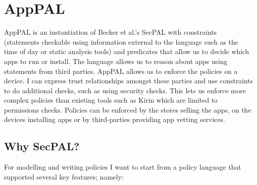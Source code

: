 \documentclass[thesis.tex]{subfiles}
\begin{document}
\chapter{AppPAL}
\label{chap:apppal}

AppPAL is an instantiation of Becker et al.'s SecPAL\cite{becker_secpal:_2010} with constraints (statements checkable using information external to the language such as the time of day or static analysis tools) and predicates that allow us to decide which apps to run or install.
The language allows us to reason about apps using statements from third parties. AppPAL allows us to enforce the policies on a device.
I can express trust relationships amongst these parties and use constraints to do additional checks, such as using security checks.
This lets us enforce more complex policies than existing tools such as Kirin which are limited to permissions checks. 
Policies can be enforced by the stores selling the apps, on the devices installing apps or by third-parties providing app vetting services.

\section{Why SecPAL?}
\label{sec:why-apppal}

For modelling and writing policies I want to start from a policy
language that supported several key features; namely:
\end{document}
